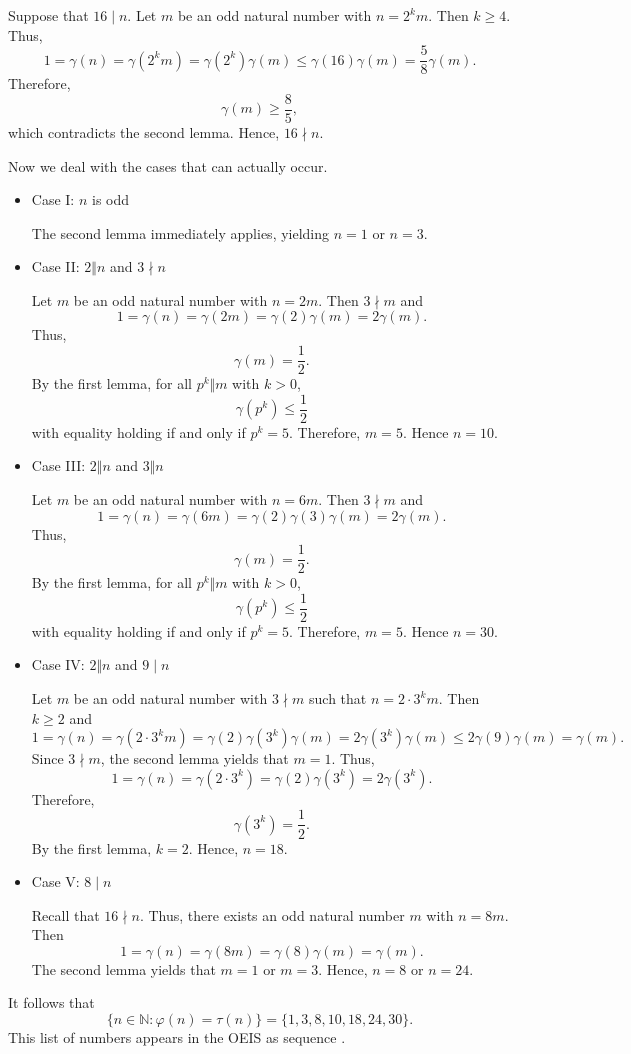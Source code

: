 \documentclass[12pt]{article}
\renewcommand{\phi}{\varphi}
\begin{document}
Suppose that $16 \mid n$.  Let $m$ be an odd natural number with $n=2^km$.  Then $k\ge 4$.  Thus,
\[
1=\gamma(n)=\gamma(2^km)=\gamma(2^k)\gamma(m)\le\gamma(16)\gamma(m)=\frac{5}{8}\gamma(m).
\]
Therefore,
\[
\gamma(m)\ge\frac{8}{5},
\]
which contradicts the second lemma.  Hence, $16 \nmid n$.

Now we deal with the cases that can actually occur.

\begin{itemize}
\item Case I: $n$ is odd

The second lemma immediately applies, yielding $n=1$ or $n=3$.

\item Case II: $2 \Vert n$ and $3 \nmid n$

Let $m$ be an odd natural number with $n=2m$.  Then $3 \nmid m$ and
\[
1=\gamma(n)=\gamma(2m)=\gamma(2)\gamma(m)=2\gamma(m).
\]
Thus,
\[
\gamma(m)=\frac{1}{2}.
\]
By the first lemma, for all $p^k \Vert m$ with $k>0$,
\[
\gamma(p^k)\le\frac{1}{2}
\]
with equality holding if and only if $p^k=5$.  Therefore, $m=5$.  Hence $n=10$.

\item Case III: $2 \Vert n$ and $3 \Vert n$

Let $m$ be an odd natural number with $n=6m$.  Then $3 \nmid m$ and
\[
1=\gamma(n)=\gamma(6m)=\gamma(2)\gamma(3)\gamma(m)=2\gamma(m).
\]
Thus,
\[
\gamma(m)=\frac{1}{2}.
\]
By the first lemma, for all $p^k \Vert m$ with $k>0$,
\[
\gamma(p^k)\le\frac{1}{2}
\]
with equality holding if and only if $p^k=5$.  Therefore, $m=5$.  Hence $n=30$.

\item Case IV: $2 \Vert n$ and $9 \mid n$

Let $m$ be an odd natural number with $3 \nmid m$ such that $n=2\cdot 3^k m$.  Then $k\ge 2$ and
\[
1=\gamma(n)=\gamma(2\cdot 3^k m)=\gamma(2)\gamma(3^k)\gamma(m)=2\gamma(3^k)\gamma(m)\le 2\gamma(9)\gamma(m)=\gamma(m).
\]
Since $3 \nmid m$, the second lemma yields that $m=1$.  Thus,
\[
1=\gamma(n)=\gamma(2\cdot 3^k)=\gamma(2)\gamma(3^k)=2\gamma(3^k).
\]
Therefore,
\[
\gamma(3^k)=\frac{1}{2}.
\]
By the first lemma, $k=2$.  Hence, $n=18$.

\item Case V: $8 \mid n$

Recall that $16 \nmid n$.  Thus, there exists an odd natural number $m$ with $n=8m$.  Then
\[
1=\gamma(n)=\gamma(8m)=\gamma(8)\gamma(m)=\gamma(m).
\]
The second lemma yields that $m=1$ or $m=3$.  Hence, $n=8$ or $n=24$.
\end{itemize}

It follows that
\[
\{n\in\mathbb{N}:\phi(n)=\tau(n)\}=\{1,3,8,10,18,24,30\}.
\]
This list of numbers appears in the OEIS as sequence .
\end{document}
